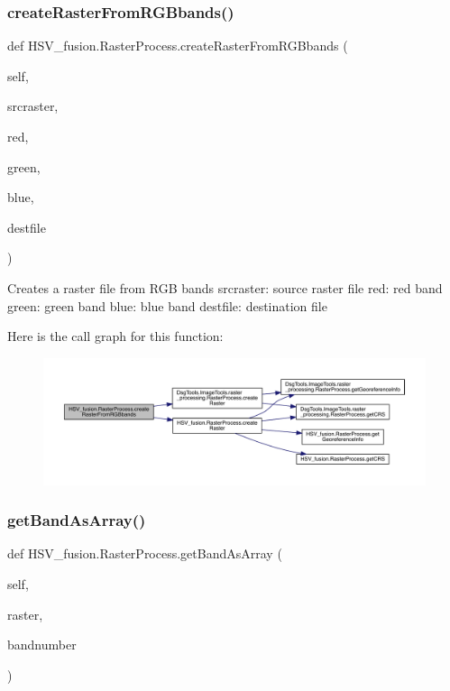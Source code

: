 \subsubsection{\texorpdfstring{create\+Raster\+From\+R\+G\+Bbands()}{createRasterFromRGBbands()}}
{\footnotesize\ttfamily def H\+S\+V\+\_\+fusion.\+Raster\+Process.\+create\+Raster\+From\+R\+G\+Bbands (\begin{DoxyParamCaption}\item[{}]{self,  }\item[{}]{srcraster,  }\item[{}]{red,  }\item[{}]{green,  }\item[{}]{blue,  }\item[{}]{destfile }\end{DoxyParamCaption})}

\begin{DoxyVerb}Creates a raster file from RGB bands
srcraster: source raster file
red: red band
green: green band
blue: blue band
destfile: destination file
\end{DoxyVerb}
 Here is the call graph for this function\+:
\nopagebreak
\begin{figure}[H]
\begin{center}
\leavevmode
\includegraphics[width=350pt]{class_h_s_v__fusion_1_1_raster_process_a50e79f6868107a0c9234edfe7800443e_cgraph}
\end{center}
\end{figure}
\mbox{\label{class_h_s_v__fusion_1_1_raster_process_a55aa52ef0965575a867ff2b994d0855a}} 
\subsubsection{\texorpdfstring{get\+Band\+As\+Array()}{getBandAsArray()}}
{\footnotesize\ttfamily def H\+S\+V\+\_\+fusion.\+Raster\+Process.\+get\+Band\+As\+Array (\begin{DoxyParamCaption}\item[{}]{self,  }\item[{}]{raster,  }\item[{}]{bandnumber }\end{DoxyParamCaption})}

